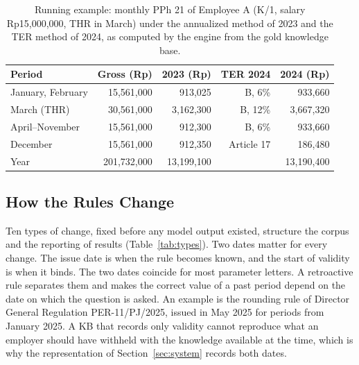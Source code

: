 \begin{table}[!t]
\caption{Running example: monthly PPh 21 of Employee A (K/1, salary Rp15,000,000, THR in March) under the annualized method of 2023 and the TER method of 2024, as computed by the engine from the gold knowledge base.}
\label{tab:slip}
\centering\footnotesize
\setlength{\tabcolsep}{4pt}
\begin{tabular}{@{}lrrrr@{}}
\toprule
Period & Gross (Rp) & 2023 (Rp) & TER 2024 & 2024 (Rp) \\
\midrule
January, February & 15,561,000 & 913,025 & B, 6\% & 933,660 \\
March (THR) & 30,561,000 & 3,162,300 & B, 12\% & 3,667,320 \\
April--November & 15,561,000 & 912,300 & B, 6\% & 933,660 \\
December & 15,561,000 & 912,350 & Article 17 & 186,480 \\
\midrule
Year & 201,732,000 & 13,199,100 & & 13,190,400 \\
\bottomrule
\end{tabular}
\end{table}

\subsection{How the Rules Change}
\label{sec:changes}
Ten types of change, fixed before any model output existed, structure the corpus and the reporting of results (Table~\ref{tab:types}). Two dates matter for every change. The issue date is when the rule becomes known, and the start of validity is when it binds. The two dates coincide for most parameter letters. A retroactive rule separates them and makes the correct value of a past period depend on the date on which the question is asked. An example is the rounding rule of Director General Regulation PER-11/PJ/2025, issued in May 2025 for periods from January 2025. A KB that records only validity cannot reproduce what an employer should have withheld with the knowledge available at the time, which is why the representation of Section~\ref{sec:system} records both dates.

